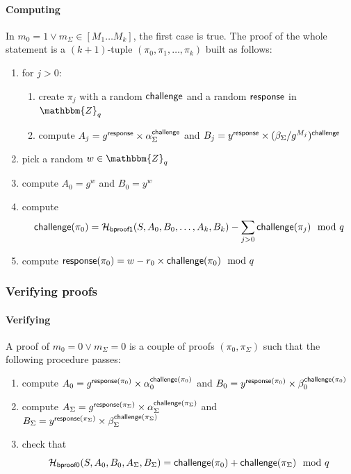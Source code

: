 \documentclass[a4paper]{article}
\newcommand{\Z}{\mathbbm{Z}}
\begin{document}
\paragraph{Computing \oproof}
In $m_0=1\lor m_\Sigma\in[M_1\dots M_k]$, the first case is
true. The proof of the whole statement is a $(k+1)$-tuple
$(\pi_0,\pi_1,\dotsc,\pi_k)$ built as follows:
\begin{enumerate}
\item for $j>0$:
  \begin{enumerate}
  \item create $\pi_j$ with a random $\textsf{challenge}$ and a random
    $\textsf{response}$ in $\Z_q$
  \item compute
    $A_j={g^{\textsf{response}}}\times{\alpha_\Sigma^{\textsf{challenge}}}$ and
    $B_j={y^{\textsf{response}}}\times{(\beta_\Sigma/g^{M_j})^{\textsf{challenge}}}$
  \end{enumerate}
\item pick a random $w\in\Z_q$
\item compute $A_0=g^w$ and $B_0=y^w$
\item compute
  \[\textsf{challenge}(\pi_0)=\mathcal{H}_{\textsf{bproof1}}(S,A_0,B_0,\dots,A_k,B_k)-\sum_{j>0}\textsf{challenge}(\pi_j)\mod q\]
\item compute $\textsf{response}(\pi_0)=w-r_0\times\textsf{challenge}(\pi_0)\mod q$
\end{enumerate}

\subsubsection{Verifying proofs}

\paragraph{Verifying \bproof}
A proof of $m_0=0\lor m_\Sigma=0$ is a couple of proofs
$(\pi_0,\pi_\Sigma)$ such that the following procedure passes:
\begin{enumerate}
\item compute
  $A_0=g^{\textsf{response}(\pi_0)}\times\alpha_0^{\textsf{challenge}(\pi_0)}$
  and
  $B_0=y^{\textsf{response}(\pi_0)}\times\beta_0^{\textsf{challenge}(\pi_0)}$
\item compute
  $A_\Sigma=g^{\textsf{response}(\pi_\Sigma)}\times\alpha_\Sigma^{\textsf{challenge}(\pi_\Sigma)}$
  and
  $B_\Sigma=y^{\textsf{response}(\pi_\Sigma)}\times\beta_\Sigma^{\textsf{challenge}(\pi_\Sigma)}$
\item check that
  \[\mathcal{H}_{\mathsf{bproof0}}(S,A_0,B_0,A_\Sigma,B_\Sigma)=\textsf{challenge}(\pi_0)+\textsf{challenge}(\pi_\Sigma)\mod q\]
\end{enumerate}
\end{document}
